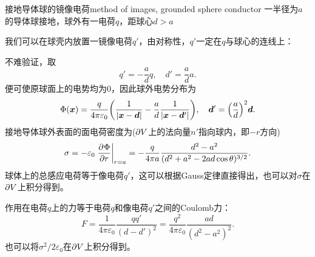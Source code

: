 \begin{example}{接地导体球的镜像电荷}{method of images, grounded sphere conductor}
    一半径为$a$的导体球接地，球外有一电荷$q$，距球心$d>a$
    \begin{center}
        \label{fig:sphere conductor}
    \end{center}
    我们可以在球壳内放置一镜像电荷$q'$，由对称性，$q'$一定在$q$与球心的连线上：
    \begin{center}
        \label{fig:image charge of sphere}
    \end{center}
    不难验证，取
    \begin{equation}
        \label{eqn:image charge of sphere}
        q'=-\frac adq,\quad d'=\frac ada.
    \end{equation}
    便可使原球面上的电势均为0，因此球外电势分布为
    \begin{equation}
        \Phi(\bm x)=\frac q{4\pi\varepsilon_0}\biggl(\frac1{|\bm x-\bm d|}-\frac ad\frac1{|\bm x-\bm d'|}\biggr),\quad\bm d'=\Bigl(\frac ad\Bigr)^2\bm d.
    \end{equation}
    \tcblower
    接地导体球外表面的面电荷密度为($\partial V$上的法向量$n'$指向球内，即$-r$方向)
    \begin{equation}
        \label{eqn:grounded sphere conductor-point, sigma}
        \sigma=-\varepsilon_0\left.\frac{\partial^{{}}\Phi}{\partial{r}^{{}}}\right\rvert_{r=a}=-\frac q{4\pi a}\frac{d^2-a^2}{(d^2+a^2-2ad\cos\theta)^{3/2}}.
    \end{equation}
    球体上的总感应电荷等于像电荷$q'$，这可以根据Gauss定律直接得出，也可以对$\sigma$在$\partial V$上积分得到。

    作用在电荷$q$上的力等于电荷$q$和像电荷$q'$之间的Coulomb力：
    \begin{equation}
        \label{eqn:grounded sphere conductor-point, F}
        F=\frac1{4\pi\varepsilon_0}\frac{qq'}{(d-d')^2}=\frac{q^2}{4\pi\varepsilon_0}\frac{ad}{(d^2-a^2)^2}.
    \end{equation}
    也可以将$\sigma^2/2\varepsilon_0$在$\partial V$上积分得到。
\end{example}

